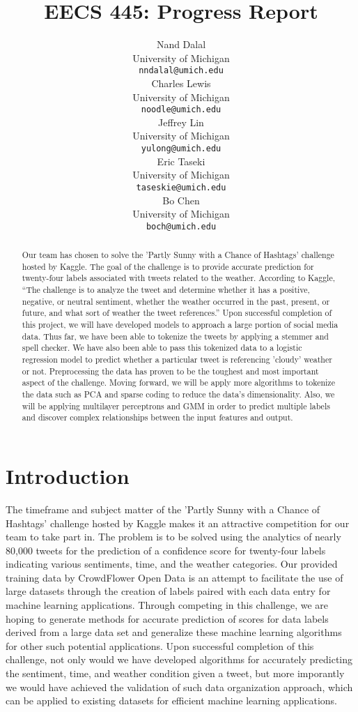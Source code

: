 \documentclass{article}
\title{EECS 445: Progress Report}
\author{
Nand Dalal \\
University of Michigan \\
\texttt{nndalal@umich.edu} \\
\And
Charles Lewis \\
University of Michigan \\
\texttt{noodle@umich.edu} \\
\AND
Jeffrey Lin \\
University of Michigan \\
\texttt{yulong@umich.edu} \\
\And
Eric Taseki \\
University of Michigan \\
\texttt{taseskie@umich.edu} \\
\And
Bo Chen \\
University of Michigan \\
\texttt{boch@umich.edu} \\
}
\begin{document}
\maketitle

\begin{abstract}
Our team has chosen to solve the 'Partly Sunny with a Chance of Hashtags' challenge hosted by Kaggle. The goal of the challenge is to provide accurate prediction for twenty-four labels associated with tweets related to the weather. According to Kaggle, ``The challenge is to analyze the tweet and determine whether it has a positive, negative, or neutral sentiment, whether the weather occurred in the past, present, or future, and what sort of weather the tweet references.'' Upon successful completion of this project, we will have developed models to approach a large portion of social media data. Thus far, we have been able to tokenize the tweets by applying a stemmer and spell checker. We have also been able to pass this tokenized data to a logistic regression model to predict whether a particular tweet is referencing 'cloudy' weather or not. Preprocessing the data has proven to be the toughest and most important aspect of the challenge. Moving forward, we will be apply more algorithms to tokenize the data such as PCA and sparse coding to reduce the data's dimensionality. Also, we will be applying multilayer perceptrons and GMM in order to predict multiple labels and discover complex relationships between the input features and output.
\end{abstract}

\section{Introduction}
The timeframe and subject matter of the 'Partly Sunny with a Chance of Hashtags' challenge hosted by Kaggle makes it an attractive competition for our team to take part in. The problem is to be solved using the analytics of nearly 80,000 tweets for the prediction of a confidence score for twenty-four labels indicating various sentiments, time, and the weather categories. Our provided training data by CrowdFlower Open Data is an attempt to facilitate the use of large datasets through the creation of labels paired with each data entry for machine learning applications. Through competing in this challenge, we are hoping to generate methods for accurate prediction of scores for data labels derived from a large data set and generalize these machine learning algorithms for other such potential applications. Upon successful completion of this challenge, not only would we have developed algorithms for accurately predicting the sentiment, time, and weather condition given a tweet, but more imporantly we would have achieved the validation of such data organization approach, which can be applied to existing datasets for efficient machine learning applications.
\end{document}
